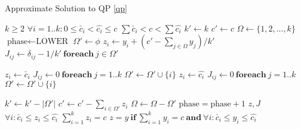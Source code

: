 \documentclass[11 pt]{article}
\begin{document}
\begin{algorithm} \label{algo_apprx_qp}
    \caption{Approximate Solution to QP \ref{qp}}
    \begin{algorithmic}[1]
        \Require $k \ge 2$
        \Require $\forall i=1..k: 0 \le \check{c_i} < \hat{c_i} \le c$
        \Require $\sum \check{c_i} < c < \sum \hat{c_i}$
        \State $k' \gets k$
        \State $c' \gets c$
        \State $\Omega \gets \{1,2,...,k\}$ 
        \State $\text{phase} \gets \text{LOWER}$ 
            \State $\Omega' \gets \phi$
                \State $z_i \gets y_i + (c'-\sum_{j \in \Omega} y_j)/k'$
                \State $J_{ij} \gets \delta_{ij} - 1/k' \ \mathbf{foreach}\  j \in \Omega'$
                    
                \EndFor
                    \State $z_i \gets \check{c_i}$
                    \State $J_{ij} \gets 0 \ \mathbf{foreach}\  j=1..k$
                    \State $\Omega' \gets \Omega' \cup \{i\}$
                    \State $z_i \gets \hat{c_i}$
                    \State $J_{ij} \gets 0 \ \mathbf{foreach}\  j=1..k$
                    \State $\Omega' \gets \Omega' \cup \{i\}$
                \EndIf
            \EndFor

            \State $k' \gets k'- |\Omega'|$
            \State $c' \gets c' - \sum_{i \in \Omega'} z_i$
            \State $\Omega \gets \Omega - \Omega'$
                \State $\text{phase} = \text{phase} + 1$
            \EndIf
        \EndWhile
        \State \Return $z, J$
        \Ensure $\forall i: \check{c_i} \le z_i \le \hat{c_i}$
        \Ensure $\sum_{i=1}^k z_i = c$
        \Ensure $z = y \ \mathbf{if}\ \sum_{i=1}^k y_i = c \ \mathbf{and}\ \forall i: \check{c_i} \le y_i \le \hat{c_i}$
    \end{algorithmic}
\end{algorithm}
\end{document}
